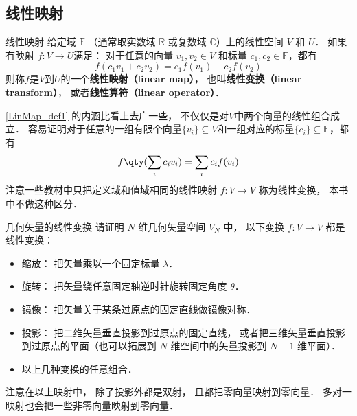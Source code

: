 
\begin{issues}
\end{issues}



\subsection{线性映射}
\begin{definition}{线性映射}\label{LinMap_def1}
给定域 $\mathbb F$ （通常取实数域 $\mathbb R$ 或复数域 $\mathbb C$）上的线性空间 $V$ 和 $U$． 如果有映射 $f:V\rightarrow U$满足： 对于任意的向量 ${v}_1, {v}_2\in V$ 和标量 $c_1, c_2 \in \mathbb{F}$，都有
\begin{equation}
f(c_1 {v}_1+c_2 {v}_2)=c_1f({v}_1)+c_2f({v}_2)
\end{equation}
则称$f$是$V$到$U$的一个\textbf{线性映射（linear map）}， 也叫\textbf{线性变换（linear transform）}， 或者\textbf{线性算符（linear operator）}．
\end{definition}

\autoref{LinMap_def1} 的内涵比看上去广一些， 不仅仅是对$V$中两个向量的线性组合成立． 容易证明对于任意的一组有限个向量$\{{v}_i\}\subseteq V$和一组对应的标量$\{c_i\}\subseteq\mathbb{F}$，都有
\begin{equation}\label{LinMap_eq1}
f\qty(\sum_i c_i {v}_i)=\sum_i c_i f({v}_i)
\end{equation}
注意一些教材中只把定义域和值域相同的线性映射 $f:V\to V$ 称为线性变换， 本书中不做这种区分．

\begin{exercise}{几何矢量的线性变换}
请证明 $N$ 维几何矢量空间 $V_N$ 中， 以下变换 $f:V\to V$ 都是线性变换：
\begin{itemize}
\item 缩放： 把矢量乘以一个固定标量 $\lambda$．
\item 旋转： 把矢量绕任意固定轴逆时针旋转固定角度 $\theta$．
\item 镜像： 把矢量关于某条过原点的固定直线做镜像对称．
\item 投影： 把二维矢量垂直投影到过原点的固定直线， 或者把三维矢量垂直投影到过原点的平面（也可以拓展到 $N$ 维空间中的矢量投影到 $N-1$ 维平面）．
\item 以上几种变换的任意组合．
\end{itemize}
\end{exercise}
注意在以上映射中， 除了投影外都是双射， 且都把零向量映射到零向量． 多对一映射也会把一些非零向量映射到零向量．

